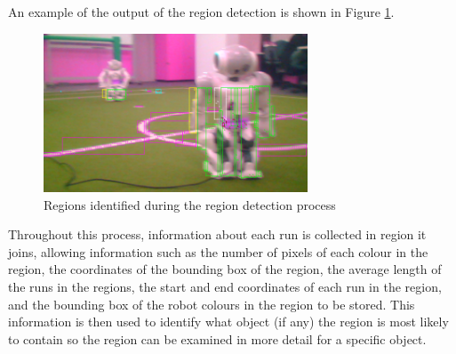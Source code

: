 \documentclass[runningheads,a4paper]{llncs}
\begin{document}
\begin{algorithmic}
    \ENDIF
    \ELSE
    \ENDIF
    \ENDIF
    \ELSE
    \ENDIF
    \ENDFOR
    \ENDIF
    \ENDIF
    \ENDFOR
    \ENDFOR
\end{algorithmic}

An example of the output of the region detection is shown in Figure \ref{fig:RegionBuilder1}.

\begin{figure} [t]
\centering
\includegraphics[width=0.7\textwidth]{figures/regionScreenshot1.png}
\caption{Regions identified during the region detection process} \label{fig:RegionBuilder1}
\end{figure}

Throughout this process, information about each run is collected in region it joins, allowing information such as the number of pixels of each colour in the region, the coordinates of the bounding box of the region, the average length of the runs in the regions, the start and end coordinates of each run in the region, and the bounding box of the robot colours in the region to be stored. This information is then used to identify what object (if any) the region is most likely to contain so the region can be examined in more detail for a specific object.
\end{document}
